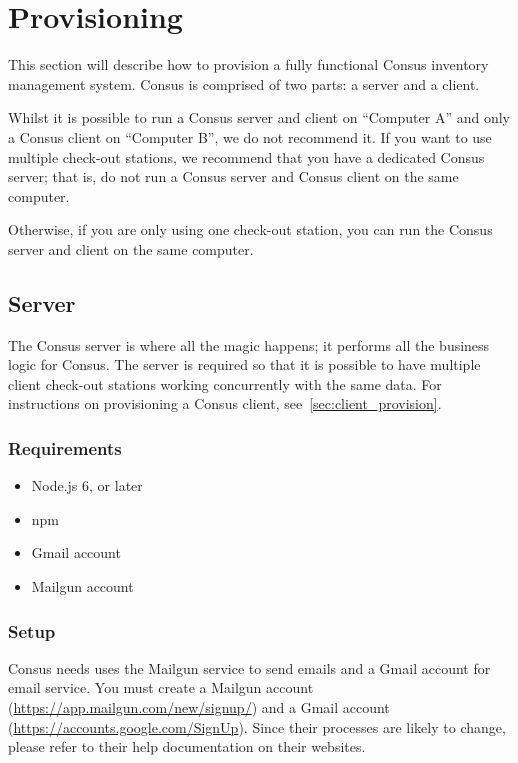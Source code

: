 \chapter{Provisioning}
\label{ch:provisioning}

This section will describe how to provision a fully functional Consus inventory management system.
Consus is comprised of two parts: a server and a client.

Whilst it is possible to run a Consus server and client on ``Computer A'' and only a Consus client on ``Computer B'', we do not recommend it. %
If you want to use multiple check-out stations, we recommend that you have a dedicated Consus server; that is, do not run a Consus server and Consus client on the same computer.

Otherwise, if you are only using one check-out station, you can run the Consus server and client on the same computer.

\section{Server}
\label{sec:server_provision}

The Consus server is where all the magic happens; it performs all the business logic for Consus.
The server is required so that it is possible to have multiple client check-out stations working concurrently with the same data.
For instructions on provisioning a Consus client, see~\autoref{sec:client_provision}.

\subsection{Requirements}
\label{subsec:server_reqs}

\begin{itemize}
  \item Node.js 6, or later
  \item npm
  \item Gmail account
  \item Mailgun account
\end{itemize}

\subsection{Setup}
\label{subsec:server_setup}

Consus needs uses the Mailgun service to send emails and a Gmail account for email service.
You must create a Mailgun account (\url{https://app.mailgun.com/new/signup/}) and a Gmail account (\url{https://accounts.google.com/SignUp}).
Since their processes are likely to change, please refer to their help documentation on their websites.

